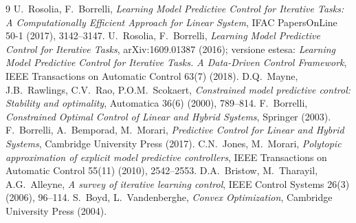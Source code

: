 \documentclass[11pt,a4paper]{article}
\theoremstyle{definition}
\theoremstyle{plain}
\theoremstyle{remark}
\begin{document}
\begin{thebibliography}{9}
 U.~Rosolia, F.~Borrelli, \emph{Learning Model
  Predictive Control for Iterative Tasks: A Computationally Efficient Approach
  for Linear System}, IFAC PapersOnLine 50-1 (2017), 3142--3147.
 U.~Rosolia, F.~Borrelli, \emph{Learning Model
  Predictive Control for Iterative Tasks}, arXiv:1609.01387 (2016); versione
  estesa: \emph{Learning Model Predictive Control for Iterative Tasks. A
  Data-Driven Control Framework}, IEEE Transactions on Automatic Control
  63(7) (2018).
 D.Q.~Mayne, J.B.~Rawlings, C.V.~Rao, P.O.M.~Scokaert,
  \emph{Constrained model predictive control: Stability and optimality},
  Automatica 36(6) (2000), 789--814.
 F.~Borrelli, \emph{Constrained Optimal Control of
  Linear and Hybrid Systems}, Springer (2003).
 F.~Borrelli, A.~Bemporad, M.~Morari, \emph{Predictive
  Control for Linear and Hybrid Systems}, Cambridge University Press (2017).
 C.N.~Jones, M.~Morari, \emph{Polytopic approximation of
  explicit model predictive controllers}, IEEE Transactions on Automatic
  Control 55(11) (2010), 2542--2553.
 D.A.~Bristow, M.~Tharayil, A.G.~Alleyne, \emph{A survey
  of iterative learning control}, IEEE Control Systems 26(3) (2006), 96--114.
 S.~Boyd, L.~Vandenberghe, \emph{Convex Optimization},
  Cambridge University Press (2004).
\end{thebibliography}
\end{document}
